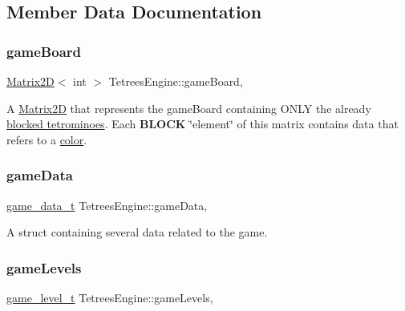 \subsection{Member Data Documentation}
\mbox{\label{classTetreesEngine_a37d082a7816d6731b2703dd6d1a1cb97}} 
\subsubsection{\texorpdfstring{game\+Board}{gameBoard}}
{\footnotesize\ttfamily \hyperlink{classMatrix2D}{Matrix2D}$<$ int $>$ Tetrees\+Engine\+::game\+Board\hspace{0.3cm}{\ttfamily [static]}, {\ttfamily [private]}}

A \hyperlink{classMatrix2D}{Matrix2D} that represents the game\+Board containing O\+N\+LY the already \hyperlink{classTetreesEngine_a0978ef1f287f00a8ed5a4af2d680b943}{blocked tetrominoes}. Each {\bfseries B\+L\+O\+CK} \char`\"{}element\char`\"{} of this matrix contains data that refers to a \hyperlink{TetreesDefs_8hpp_a8ba5fbce2446135735693ab60c896bbd}{color}. \mbox{\label{classTetreesEngine_afa356b8bb38e8918400e7175d6fbbd2e}} 
\subsubsection{\texorpdfstring{game\+Data}{gameData}}
{\footnotesize\ttfamily \hyperlink{structgame__data__t}{game\+\_\+data\+\_\+t} Tetrees\+Engine\+::game\+Data\hspace{0.3cm}{\ttfamily [static]}, {\ttfamily [private]}}

A struct containing several data related to the game. \mbox{\label{classTetreesEngine_a03ea87d7cefe7b216977c9123fc6ef60}} 
\subsubsection{\texorpdfstring{game\+Levels}{gameLevels}}
{\footnotesize\ttfamily \hyperlink{structgame__level__t}{game\+\_\+level\+\_\+t} Tetrees\+Engine\+::game\+Levels\hspace{0.3cm}{\ttfamily [static]}, {\ttfamily [private]}}

